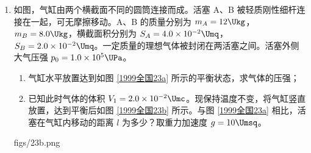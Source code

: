 \documentclass[\gkver]{gaokaozhenti}
\begin{document}
\begin{enumerate}
{$a_x = \frac{v_x}{t} = 0.20\Umsq$ ⑨，

$a_y = \frac{v_y}{t} = 0.20\Umsq$ ⑩，

在第 3 秒末小球到达的位置坐标为

$x_3 = x_2 + v_x t - \frac{1}{2}a_x t^{2} = 0.40\Um$ \textcircled{11}，

$y_3 = y_2 + v_y t - \frac{1}{2}a_y t^{2} = 0.20\Um$ \textcircled{12}。

小球的轨迹如图所示，小球的位置为 $(0.40\Um, 0.20\Um)$。

}

\item
如图，气缸由两个横截面不同的圆筒连接而成。活塞 A、B 被轻质刚性细杆连接在一起，可无摩擦移动。A、B 的质量分别为 $m_{A} = 12\Ukg$，$m_{B} = 8.0\Ukg$，横截面积分别为 $S_{A} = 4.0\times10^{-2}\Umq$，$S_{B} = 2.0\times10^{-2}\Umq$。一定质量的理想气体被封闭在两活塞之间。活塞外侧大气压强 $p_{0} = 1.0\times10^{5}\UPa$。
\begin{enumerate}
	\item
	气缸水平放置达到如图 \ref{1999全国23a} 所示的平衡状态，求气体的压强；
	\item
	已知此时气体的体积 $V_{1} = 2.0\times10^{-2}\Umc$。现保持温度不变，将气缸竖直放置，达到平衡后如图 \ref{1999全国23b} 所示。与图 \ref{1999全国23a} 相比，活塞在气缸内移动的距离 $l$ 为多少？取重力加速度 $g = 10\Umsq$。
\end{enumerate}
{figs/23b.png}
\end{enumerate}
\end{document}
